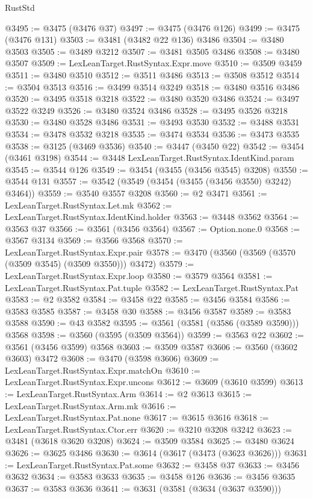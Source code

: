 \begin{lexlean}{RustStd}
\begin{coremodule}
{\begin{coremodule}
{{{{{{{{{{{{{{{{{{{{{{{{{{{{{{{{{{{{{{{{{{{{{@3495 := @3475 (@3476 @37)
@3497 := @3475 (@3476 @126)
@3499 := @3475 (@3476 @131)
@3503 := @3481 (@3482 @22 @136) @3486
@3504 := @3480 @3503
@3505 := @3489 @3212
@3507 := @3481 @3505 @3486
@3508 := @3480 @3507
@3509 := LexLeanTarget.RustSyntax.Expr.move
@3510 := @3509 @3459
@3511 := @3480 @3510
@3512 := @3511 @3486
@3513 := @3508 @3512
@3514 := @3504 @3513
@3516 := @3499 @3514 @3249
@3518 := @3480 @3516 @3486
@3520 := @3495 @3518 @3218
@3522 := @3480 @3520 @3486
@3524 := @3497 @3522 @3249
@3526 := @3480 @3524 @3486
@3528 := @3495 @3526 @3218
@3530 := @3480 @3528 @3486
@3531 := @3493 @3530
@3532 := @3488 @3531
@3534 := @3478 @3532 @3218
@3535 := @3474 @3534
@3536 := @3473 @3535
@3538 := @3125 (@3469 @3536)
@3540 := @3447 (@3450 @22)
@3542 := @3454 (@3461 @3198)
@3544 := @3448 LexLeanTarget.RustSyntax.IdentKind.param
@3545 := @3544 @126
@3549 := @3454 (@3455 (@3456 @3545) @3208)
@3550 := @3544 @131
@3557 := @3542 (@3549 (@3454 (@3455 (@3456 @3550) @3242) @3464))
@3559 := @3540 @3557 @3208
@3560 := @2 @3471
@3561 := LexLeanTarget.RustSyntax.Let.mk
@3562 := LexLeanTarget.RustSyntax.IdentKind.holder
@3563 := @3448 @3562
@3564 := @3563 @37
@3566 := @3561 (@3456 @3564)
@3567 := Option.none.{0}
@3568 := @3567 @3134
@3569 := @3566 @3568
@3570 := LexLeanTarget.RustSyntax.Expr.pair
@3578 := @3470 (@3560 (@3569 (@3570 (@3509 @3545) (@3509 @3550))) @3472)
@3579 := LexLeanTarget.RustSyntax.Expr.loop
@3580 := @3579 @3564
@3581 := LexLeanTarget.RustSyntax.Pat.tuple
@3582 := LexLeanTarget.RustSyntax.Pat
@3583 := @2 @3582
@3584 := @3458 @22
@3585 := @3456 @3584
@3586 := @3583 @3585
@3587 := @3458 @30
@3588 := @3456 @3587
@3589 := @3583 @3588
@3590 := @43 @3582
@3595 := @3561 (@3581 (@3586 (@3589 @3590))) @3568
@3598 := @3560 (@3595 (@3509 @3564))
@3599 := @3563 @22
@3602 := @3561 (@3456 @3599) @3568
@3603 := @3509 @3587
@3606 := @3560 (@3602 @3603) @3472
@3608 := @3470 (@3598 @3606)
@3609 := LexLeanTarget.RustSyntax.Expr.matchOn
@3610 := LexLeanTarget.RustSyntax.Expr.uncons
@3612 := @3609 (@3610 @3599)
@3613 := LexLeanTarget.RustSyntax.Arm
@3614 := @2 @3613
@3615 := LexLeanTarget.RustSyntax.Arm.mk
@3616 := LexLeanTarget.RustSyntax.Pat.none
@3617 := @3615 @3616
@3618 := LexLeanTarget.RustSyntax.Ctor.err
@3620 := @3210 @3208 @3242
@3623 := @3481 (@3618 @3620 @3208)
@3624 := @3509 @3584
@3625 := @3480 @3624
@3626 := @3625 @3486
@3630 := @3614 (@3617 (@3473 (@3623 @3626)))
@3631 := LexLeanTarget.RustSyntax.Pat.some
@3632 := @3458 @37
@3633 := @3456 @3632
@3634 := @3583 @3633
@3635 := @3458 @126
@3636 := @3456 @3635
@3637 := @3583 @3636
@3641 := @3631 (@3581 (@3634 (@3637 @3590)))
}}}}}}}}}}}}}}}}}}}}}}}}}}}}}}}}}}}}}}}}}}}}}
\end{coremodule}}
\end{coremodule}
\end{lexlean}

